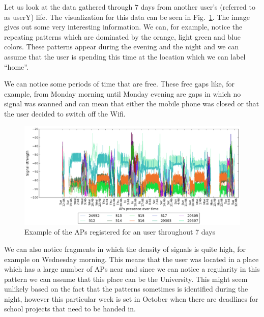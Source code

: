 Let us look at the data gathered through $7$ days from another user's (referred
to as userY) life. The visualization for this data can be seen in
Fig.~\ref{user_3_7d}. The image gives out some very interesting information. We
can, for example, notice the repeating patterns which are dominated by the
orange, light green and blue colors. These patterns appear during the evening
and the night and we can assume that the user is spending this time at the
location which we can label ``home''.

We can notice some periods of time that are free. These free gaps like, for
example, from Monday morning until Monday evening are gaps in which no signal
was scanned and can mean that either the mobile phone was closed or that the
user decided to switch off the Wifi.

\begin{figure}[h]
\centering
\includegraphics[height =
0.45\textwidth]{figures/user_3_sorted_7days_plot.png}
\caption{Example of the APs registered for an user throughout 7 days}
\label{user_3_7d}
\end{figure}

We can also notice fragments in which the density of signals is quite high, for
example on Wednesday morning. This means that the user was located in a place
which has a large number of APs near and since we can notice a regularity in
this pattern we can assume that this place can be the University. This might
seem unlikely based on the fact that the patterns sometimes is identified during
the night, however this particular week is set in October when there are
deadlines for school projects that need to be handed in.

